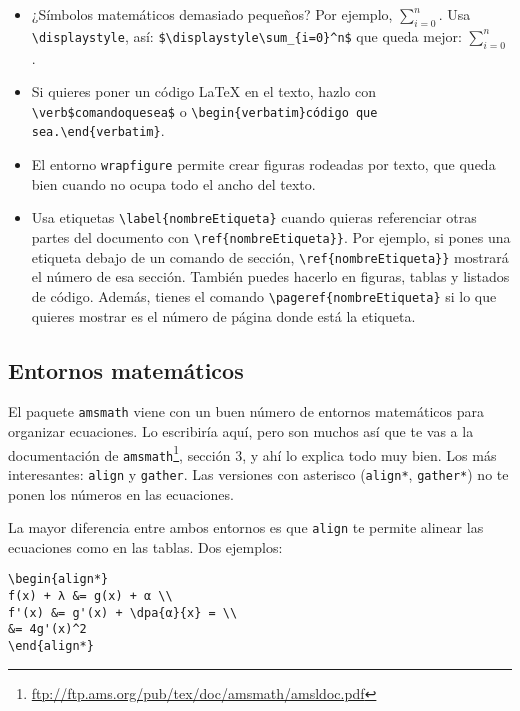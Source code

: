 \documentclass[nochap]{apuntes}
\begin{document}
\begin{itemize}
\item ¿Símbolos matemáticos demasiado pequeños? Por ejemplo, $\sum_{i=0}^n$. Usa \verb|\displaystyle|, así: \verb|$\displaystyle\sum_{i=0}^n$| que queda mejor: $\displaystyle\sum_{i=0}^n$.
\item Si quieres poner un código LaTeX en el texto, hazlo con \verb|\verb$comandoquesea$| o \verb|\begin{verbatim}código que sea.\end{verbatim}|.
\item El entorno \texttt{wrapfigure} permite crear figuras rodeadas por texto, que queda bien cuando no ocupa  todo el ancho del texto.
\item Usa etiquetas \verb|\label{nombreEtiqueta}| cuando quieras referenciar otras partes del documento con \verb|\ref{nombreEtiqueta}}|. Por ejemplo, si pones una etiqueta debajo de un comando de sección, \verb|\ref{nombreEtiqueta}}| mostrará el número de esa sección. También puedes hacerlo en figuras, tablas y listados de código. Además, tienes el comando \verb|\pageref{nombreEtiqueta}| si lo que quieres mostrar es el número de página donde está la etiqueta.
\end{itemize} 

\subsection{Entornos matemáticos}

El paquete \texttt{amsmath} viene con un buen número de entornos matemáticos para organizar ecuaciones. Lo escribiría aquí, pero son muchos así que te vas a la documentación de \texttt{amsmath}\footnote{\url{ftp://ftp.ams.org/pub/tex/doc/amsmath/amsldoc.pdf}}, sección 3, y ahí lo explica todo muy bien. Los más interesantes: \texttt{align} y \texttt{gather}. Las versiones con asterisco (\texttt{align*}, \texttt{gather*}) no te ponen los números en las ecuaciones. 

La mayor diferencia entre ambos entornos es que \texttt{align} te permite alinear las ecuaciones como en las tablas. Dos ejemplos:

\begin{verbatim}
\begin{align*}
f(x) + λ &= g(x) + α \\
f'(x) &= g'(x) + \dpa{α}{x} = \\
&= 4g'(x)^2
\end{align*}
\end{verbatim}
\end{document}
